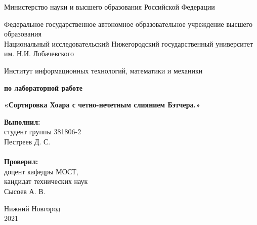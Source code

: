 \documentclass{report}
\begin{document}
\begin{titlepage}

\begin{center}
Министерство науки и высшего образования Российской Федерации
\end{center}

\begin{center}
Федеральное государственное автономное образовательное учреждение высшего образования \\
Национальный исследовательский Нижегородский государственный университет им. Н.И. Лобачевского
\end{center}

\begin{center}
Институт информационных технологий, математики и механики
\end{center}

\vspace{4em}

\begin{center}
\textbf{ по лабораторной работе} \\
\end{center}
\begin{center}
\textbf{\Large«Сортировка Хоара с четно-нечетным слиянием Бэтчера.»} \\
\end{center}

\vspace{4em}

\newbox{\lbox}
\newlength{\maxl}
\setlength{\maxl}{\wd\lbox}
\hfill\parbox{7cm}{
\hspace*{5cm}\hspace*{-5cm}\textbf{Выполнил:} \\ студент группы 381806-2 \\ Пестреев Д. С.\\
\\
\hspace*{5cm}\hspace*{-5cm}\textbf{Проверил:}\\ доцент кафедры МОСТ, \\ кандидат технических наук \\ Сысоев А. В.\\
}
\vspace{\fill}

\begin{center} Нижний Новгород \\ 2021 \end{center}

\end{titlepage}
\end{document}

